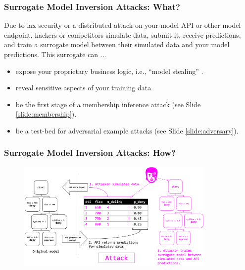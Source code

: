 \documentclass[11pt,
               aspectratio=169,
               hyperref={colorlinks}
               ]{beamer}
\begin{document}
			\begin{frame}
		
				\frametitle{Surrogate Model Inversion Attacks: \textbf{What?}}
				
Due to lax security or a distributed attack on your model API or other model endpoint, hackers or competitors simulate data, submit it, receive predictions, and train a surrogate model between their simulated data and your model predictions. This surrogate can ...
				\begin{itemize}
				\item expose your proprietary business logic, i.e., ``model stealing'' \cite{model_stealing}. 
				\item reveal sensitive aspects of your training data. 
				\item be the first stage of a membership inference attack (see Slide \ref{slide:membership}).
				\item be a test-bed for adversarial example attacks (see Slide \ref{slide:adversary}). 
				\end{itemize}

			\end{frame}
		
			\begin{frame}[label={slide:inversion}]
		
				\frametitle{Surrogate Model Inversion Attacks: \textbf{How?}}	
			
				\begin{figure}[htb]
					\begin{center}
						\includegraphics[height=150pt]{../img/inversion.PNG}
					\end{center}
				\end{figure}	

			\end{frame}
		
\end{document}
